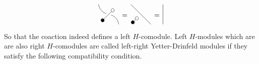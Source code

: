\documentclass{article}
\begin{document}
\begin{equation}
\begin{gathered}
\begin{tikzpicture}[whit/.style={draw,regular polygon,
	regular polygon sides=4,fill=white}]
\node (0) at (0,0) {};
\node [scale=0.5, draw, circle, fill=black] (1) at (-0.3,-0.3) {};
\node [scale=0.5, draw, circle, fill=white] (2) at (0.2,0.2) {};
\draw (1)--(2);
\draw [bend right] (0.5, -0.5) to (0);
\draw [bend left] (0) to (-0.5,0.5);
\end{tikzpicture}
\end{gathered}
\, = \,
\begin{gathered}
\begin{tikzpicture}[whit/.style={draw,regular polygon,
	regular polygon sides=4,fill=white}]
\node (0) at (0,0) {};
\node [scale=0.5, draw, circle, fill=black] (1) at (-0.4,-0.4) {};
\node [scale=0.5, draw, circle, fill=white] (2) at (-0.2,-0.2) {};
\draw (1)--(2);
\draw (0.5, -0.5)--(-0.5,0.5);
\end{tikzpicture}
\end{gathered}
\, = \,	
\begin{gathered}
\begin{tikzpicture}[whit/.style={draw,regular polygon,
	regular polygon sides=4,fill=white}]
\draw (0,-0.5) to (0,0.5);
\end{tikzpicture}
\end{gathered}	
\end{equation}
So that the coaction indeed defines a left $H$-comodule. Left $H$-modules which are are also right $H$-comodules are called left-right Yetter-Drinfeld modules if they satisfy the following compatibility condition.
\end{document}
